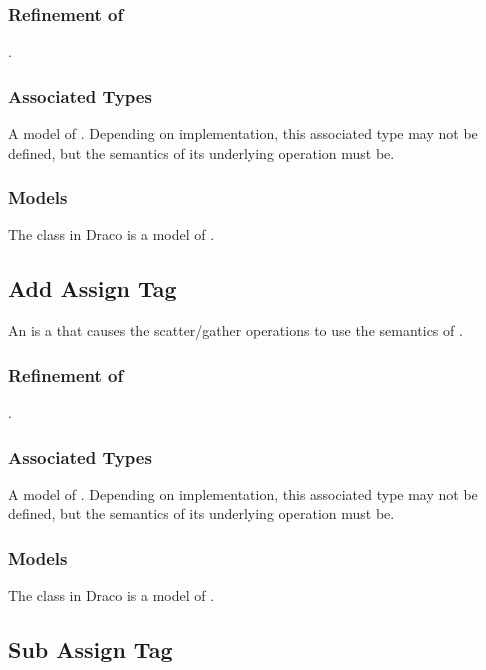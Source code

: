 \documentclass[note]{newmemo}
\begin{document}
\subsubsection{Refinement of}
.

\subsubsection{Associated Types}

A model of . Depending on implementation, this
associated type may not be defined, but the semantics of its
underlying operation must be.

\subsubsection{Models}

The  class in Draco is a model of
.

\subsection{Add Assign Tag}

An  is a  that
causes the  scatter/gather operations to use
the semantics of .

\subsubsection{Refinement of}
.

\subsubsection{Associated Types}

A model of . Depending on implementation, this
associated type may not be defined, but the semantics of its
underlying operation must be.

\subsubsection{Models}

The  class in Draco is a model of
.

\bigskip

\subsection{Sub Assign Tag}
\end{document}
